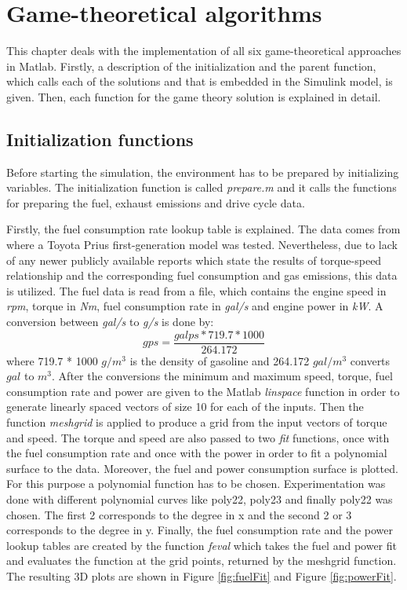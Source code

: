 \section{Game-theoretical algorithms}
This chapter deals with the implementation of all six game-theoretical approaches in Matlab. Firstly, a description of the initialization and the parent function, which calls each of the solutions and that is embedded in the Simulink model, is given. Then, each function for the game theory solution is explained in detail.

\subsection{Initialization functions}
\label{sec:initfunc}
Before starting the simulation, the environment has to be prepared by initializing variables. The initialization function is called \textit{prepare.m} and it calls the functions for preparing the fuel, exhaust emissions and drive cycle data. 

Firstly, the fuel consumption rate lookup table is explained. The data comes from \citet{argonne1999} where a Toyota Prius first-generation model was tested. Nevertheless, due to lack of any newer publicly available reports which state the results of torque-speed relationship and the corresponding fuel consumption and gas emissions, this data is utilized. The fuel data is read from a file, which contains the engine speed in \textit{rpm}, torque in \textit{Nm}, fuel consumption rate in \textit{gal/s} and engine power in \textit{kW}.  A conversion between \textit{gal/s} to \textit{g/s} is done by:
\begin{equation}
gps = \frac{galps * 719.7 * 1000}{264.172}
\end{equation}
where 719.7 * 1000 $g/m^3$ is the density of gasoline and 264.172 $gal/m^3$ converts $gal$ to $m^3$. After the conversions the minimum and maximum speed, torque, fuel consumption rate and power are given to the Matlab \textit{linspace} function in order to generate linearly spaced vectors of size 10 for each of the inputs. Then the function \textit{meshgrid} is applied to produce a grid from the input vectors of torque and speed. The torque and speed are also passed to two \textit{fit} functions, once with the fuel consumption rate and once with the power in order to fit a polynomial surface to the data. Moreover, the fuel and power consumption surface is plotted. For this purpose a polynomial function has to be chosen. Experimentation was done with different polynomial curves like poly22, poly23 and finally poly22 was chosen. The first 2 corresponds to the degree in x and the second 2 or 3 corresponds to the degree in y. Finally, the fuel consumption rate and the power lookup tables are created by the function \textit{feval} which takes the fuel and power fit and evaluates the function at the grid points, returned by the meshgrid function. The resulting 3D plots are shown in Figure \ref{fig:fuelFit} and Figure \ref{fig:powerFit}.

